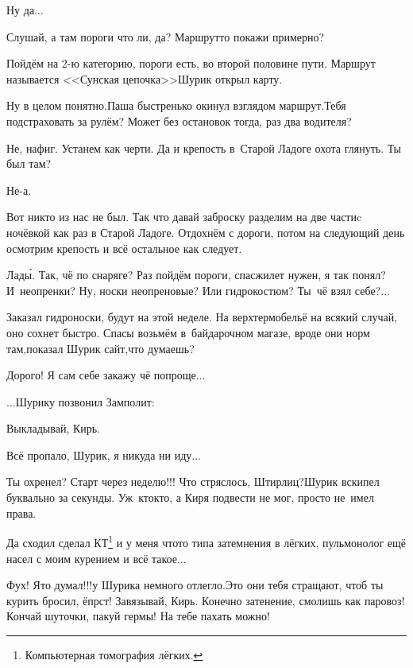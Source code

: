 \diagdash Ну да$\ldots$

\diagdash Слушай, а там пороги что ли, да? Маршрут\sdash то покажи примерно?

\diagdash Пойдём на 2-ю категорию, пороги есть, во второй половине пути. Маршрут называется <<Сунская цепочка>>\mdash Шурик открыл карту.

\diagdash Ну в целом понятно.\mdash Паша быстренько окинул взглядом маршрут.\mdash Тебя подстраховать за рулём? Может без остановок тогда, раз два водителя?

\diagdash Не, нафиг. Устанем как черти. Да и крепость в~Старой Ладоге охота глянуть. Ты был там?

\diagdash Не-а.

\diagdash Вот никто из нас не был. Так что давай заброску разделим на две части\mdash c ночёвкой как раз в Старой Ладоге. Отдохнём с дороги, потом на следующий день осмотрим крепость и всё остальное как следует.

\diagdash Лад\'{ы}. Так, чё по снаряге? Раз пойдём пороги, спасжилет нужен, я так понял? И~неопренки? Ну, носки неопреновые? Или гидрокостюм? Ты~чё взял себе?$\ldots$

\diagdash Заказал гидроноски, будут на этой неделе. На верх\mdash термобельё на всякий случай, оно сохнет быстро. Спасы возьмём в~байдарочном магазе, вроде они норм там,\mdash показал Шурик сайт,\mdash что думаешь?

\diagdash Дорого! Я сам себе закажу чё попроще$\ldots$

\vspace{0.5cm}
$\ldots$Шурику позвонил Замполит:

\diagdash Выкладывай, Кирь.

\diagdash Всё пропало, Шурик, я никуда ни иду$\ldots$

\diagdash Ты охренел? Старт через неделю!!! Что стряслось, Штирлиц?\mdash Шурик вскипел буквально за секунды. Уж~кто\sdash кто, а Киря подвести не мог, просто не~имел права. 

\setcounter{footnote}{0}
\renewcommand*{\thefootnote}{\fnsymbol{footnote}}
\diagdash Да сходил сделал КТ\footnote{Компьютерная томография лёгких.} и у меня что\sdash то типа затемнения в лёгких, пульмонолог ещё насел с моим курением и всё такое$\ldots$

\diagdash Фух! Я\sdash то думал!!!\mdash у Шурика немного отлегло.\mdash Это они тебя стращают, чтоб ты курить бросил, ёпрст! Завязывай, Кирь. Конечно затенение, смолишь как паровоз! Кончай шуточки, пакуй гермы! На тебе пахать можно!

